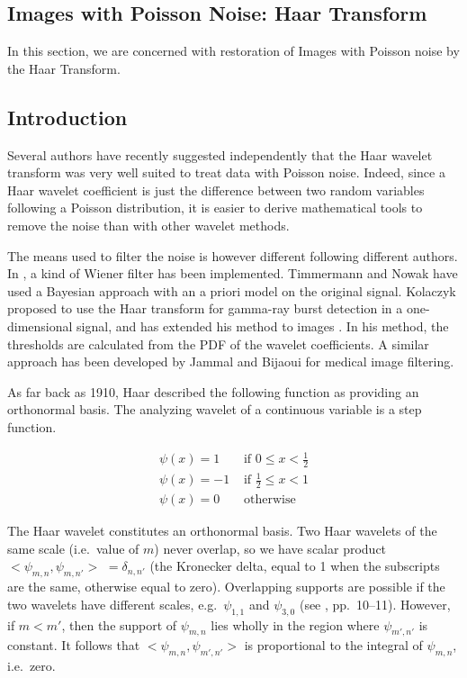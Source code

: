 \begin{itemize}
\newpage
\section{Images with Poisson Noise: Haar Transform}

In this section, we are concerned with 
restoration of Images with Poisson noise by the Haar Transform.

\subsection{Introduction}
Several authors 
\cite{wave:kolac97,wave:kolac99,wave:timmermann99,wave:nowak99,wave:jammal99} 
have recently suggested independently that the 
Haar wavelet transform was
very well suited to treat data with Poisson noise. Indeed, 
since a Haar wavelet coefficient
is just the difference between two random variables following a Poisson
distribution, it is easier to derive mathematical tools to remove the 
noise than with other wavelet methods. 

The means used to filter the noise is however different following 
different authors.
In \cite{wave:nowak99}, a kind of Wiener filter has been implemented.
Timmermann and Nowak \cite{wave:timmermann99} have used
a Bayesian approach with an a priori model on the original signal.
Kolaczyk \cite{wave:kolac97} proposed to use the Haar transform 
for gamma-ray burst detection
in a one-dimensional signal, and has extended his 
method to images \cite{wave:kolac99}. In his method, the thresholds are 
calculated from the PDF of the wavelet coefficients. A similar approach
has been developed by Jammal and Bijaoui \cite{wave:jammal99} for medical
image filtering.

As far back as 1910, Haar described the following function as providing
an orthonormal basis.  The analyzing
wavelet of a continuous variable is a step function.

\[\begin{array}{ll}
\psi(x)  = 1               & \mbox{ if } 0 \leq x < \frac{1}{2} \\
\psi(x) = -1               & \mbox{ if } \frac{1}{2} \leq x < 1 \\
\psi(x) = 0                & \mbox{ otherwise}
\end{array}\]

The Haar wavelet constitutes an orthonormal basis.  Two Haar wavelets of the 
same scale (i.e.\ value of $m$) never overlap, so we have scalar product 
$<\psi_{m,n}, \psi_{m,n'}> $ $= \delta_{n,n'} $ (the Kronecker delta,
equal to 1 when the subscripts are the same, otherwise equal to zero).  
Overlapping supports are
possible if the two wavelets have different scales, e.g.\ 
$\psi_{1,1}$ and $\psi_{3,0}$ (see \cite{wave:daube92}, 
pp.\ 10--11).  However, if 
$m < m'$, then the support of $\psi_{m,n}$ lies wholly in the region where
$\psi_{m',n'}$ is constant.  It follows that $<\psi_{m,n}, \psi_{m',n'}>$
is proportional to the integral of $\psi_{m,n}$, i.e.\ zero.


\end{itemize}
